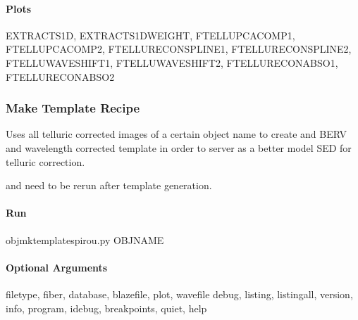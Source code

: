 \documentclass[a4paper,10pt,english]{report}
\begin{document}
\paragraph{Plots}
\label{\detokenize{user/spirou/recipes/fit_tellu:plots}}
\begin{sphinxVerbatim}[commandchars=\\\{\}]
EXTRACT\PYGZus{}S1D, EXTRACT\PYGZus{}S1D\PYGZus{}WEIGHT, FTELLU\PYGZus{}PCA\PYGZus{}COMP1, FTELLU\PYGZus{}PCA\PYGZus{}COMP2,
FTELLU\PYGZus{}RECON\PYGZus{}SPLINE1, FTELLU\PYGZus{}RECON\PYGZus{}SPLINE2, FTELLU\PYGZus{}WAVE\PYGZus{}SHIFT1,
FTELLU\PYGZus{}WAVE\PYGZus{}SHIFT2, FTELLU\PYGZus{}RECON\PYGZus{}ABSO1, FTELLU\PYGZus{}RECON\PYGZus{}ABSO2
\end{sphinxVerbatim}


\subsubsection{Make Template Recipe}
\label{\detokenize{user/spirou/recipes/make_template:make-template-recipe}}\label{\detokenize{user/spirou/recipes/make_template:recipes-spirou-make-template}}\label{\detokenize{user/spirou/recipes/make_template::doc}}
Uses all telluric corrected images of a certain object name to create
and BERV and wavelength corrected template in order to server as a better
model SED for telluric correction.

 and  need to be rerun after
template generation.


\paragraph{Run}
\label{\detokenize{user/spirou/recipes/make_template:run}}
\begin{sphinxVerbatim}[commandchars=\\\{\}]
obj\PYGZus{}mk\PYGZus{}template\PYGZus{}spirou.py \PYG{o}{[}OBJNAME\PYG{o}{]}
\end{sphinxVerbatim}


\paragraph{Optional Arguments}
\label{\detokenize{user/spirou/recipes/make_template:optional-arguments}}
\begin{sphinxVerbatim}[commandchars=\\\{\}]
\PYGZhy{}\PYGZhy{}filetype, \PYGZhy{}fiber,
\PYGZhy{}\PYGZhy{}database, \PYGZhy{}\PYGZhy{}blazefile, \PYGZhy{}\PYGZhy{}plot, \PYGZhy{}\PYGZhy{}wavefile
\PYGZhy{}\PYGZhy{}debug, \PYGZhy{}\PYGZhy{}listing, \PYGZhy{}\PYGZhy{}listingall, \PYGZhy{}\PYGZhy{}version, \PYGZhy{}\PYGZhy{}info,
\PYGZhy{}\PYGZhy{}program, \PYGZhy{}\PYGZhy{}idebug, \PYGZhy{}\PYGZhy{}breakpoints, \PYGZhy{}\PYGZhy{}quiet, \PYGZhy{}\PYGZhy{}help
\end{sphinxVerbatim}
\end{document}
